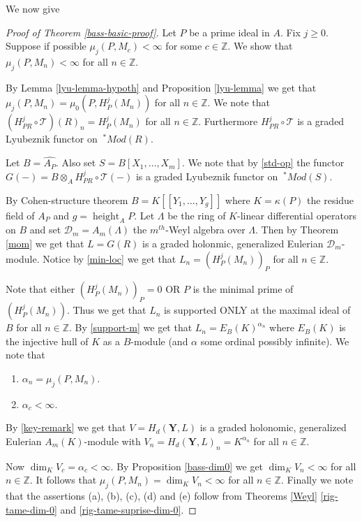 \documentclass{amsart}
\newcommand{\ZZ}{\mathbb{Z} }
\newcommand{\D}{\mathcal{D} }
\newcommand{\bY}{\mathbf{Y} }
\newcommand{\FF}{\mathcal{T}}
\newcommand{\height}{\operatorname{height}}
\theoremstyle{plain}
\theoremstyle{definition}
\theoremstyle{remark}
\begin{document}
We now give
\begin{proof}[Proof of Theorem \ref{bass-basic-proof}]
Let $P$ be a prime ideal in $A$. Fix $j \geq 0$. Suppose if possible $\mu_j(P, M_c) < \infty$ for some $c \in \ZZ$. We show that  $\mu_j(P, M_n) < \infty$ for all $n \in \ZZ$.

By Lemma \ref{lyu-lemma-hypoth} and Proposition \ref{lyu-lemma} we get 
that $\mu_j(P, M_n) = \mu_0(P, H^j_P(M_n))$ for all $n \in \ZZ$.
We note that $(H^j_{PR}\circ \FF)(R)_n = H^j_P(M_n)$ for all $n \in \ZZ$. Furthermore $H^j_{PR}\circ\FF$ is a graded Lyubeznik functor on $\ ^*Mod(R)$.


Let $B = \widehat{A_P}$. Also 
 set $S = B[X_1,\ldots, X_m]$.
 We note that by \ref{std-op} the functor $G(-) = B \otimes_A H^j_{PR}\circ\FF(-)$ is a graded Lyubeznik functor on $ \ ^* Mod(S)$.
 
 By Cohen-structure theorem $B = K[[Y_1,\ldots, Y_g]]$ where $K = \kappa(P)$ the residue field of $A_P$  and $g = \height_A P$.
 Let $\Lambda $ be the ring of $K$-linear differential operators on $B$ and set $\D_m = A_m(\Lambda)$ the $m^{th}$-Weyl algebra
 over $\Lambda$. Then by  Theorem \ref{mom} we get that $L = G(R)$ is a graded holonmic, generalized Eulerian
 $\D_m$-module. Notice  by \ref{min-loc} we get that 
 $L_n = (H^j_P(M_n))_P $ for all $n \in \ZZ$.
 
 Note that either $(H^j_P(M_n))_P  = 0$ OR
  $P$ is the minimal prime of $(H^j_P(M_n))$. Thus we get that $L_n$ is supported  ONLY at the maximal ideal of $B$ for all $n \in \ZZ$. By \ref{support-m} we get that $L_n = E_B(K)^{\alpha_n}$ where 
 $E_B(K)$ is the injective hull of $K$ as a $B$-module (and $\alpha$ some ordinal possibly infinite). We note that
 \begin{enumerate}
 \item
 $\alpha_n = \mu_j(P, M_n)$.
 \item
 $\alpha_c < \infty$.
 \end{enumerate}
    By \ref{key-remark} we get that
$V = H_d(\bY, L)$ is a graded holonomic, generalized Eulerian $A_m(K)$-module with $V_n = H_d(\bY, L)_n = K^{\alpha_n}$ for all $n \in \ZZ$.

Now $\dim_K V_c = \alpha_c < \infty$. By Proposition \ref{bass-dim0} we get $\dim_K V_n < \infty $ for all $n \in \ZZ$. It follows that $\mu_j(P, M_n) = \dim_K V_n < \infty$ for all $n \in \ZZ$.  Finally we note that the assertions (a), (b), (c), (d) and (e) follow from Theorems \ref{Weyl} \ref{rig-tame-dim-0} and  \ref{rig-tame-suprise-dim-0}.
 \end{proof}
 
\end{document}

